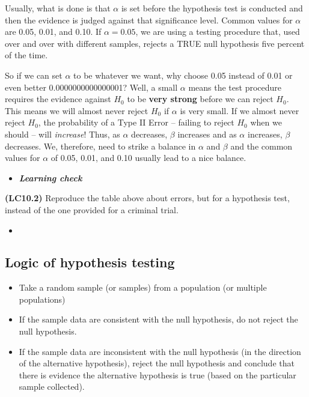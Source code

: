 \documentclass[12pt,]{krantz}
\providecommand{\tightlist}{%
  \setlength{\itemsep}{0pt}\setlength{\parskip}{0pt}}
\newenvironment{rmdblock}[1]
  {\begin{shaded*}
  \begin{itemize}
  \renewcommand{\labelitemi}{
    \raisebox{-.7\height}[0pt][0pt]{
    }
  }
  \item
  }
  {
  \end{itemize}
  \end{shaded*}
  }
\newenvironment{learncheck}
  {\begin{rmdblock}{warning}}
  {\end{rmdblock}}
\begin{document}
Usually, what is done is that \(\alpha\) is set before the hypothesis
test is conducted and then the evidence is judged against that
significance level. Common values for \(\alpha\) are 0.05, 0.01, and
0.10. If \(\alpha = 0.05\), we are using a testing procedure that, used
over and over with different samples, rejects a TRUE null hypothesis
five percent of the time.

So if we can set \(\alpha\) to be whatever we want, why choose 0.05
instead of 0.01 or even better 0.0000000000000001? Well, a small
\(\alpha\) means the test procedure requires the evidence against
\(H_0\) to be \textbf{very strong} before we can reject \(H_0\). This
means we will almost never reject \(H_0\) if \(\alpha\) is very small.
If we almost never reject \(H_0\), the probability of a Type II Error --
failing to reject \(H_0\) when we should -- will \emph{increase}! Thus,
as \(\alpha\) decreases, \(\beta\) increases and as \(\alpha\)
increases, \(\beta\) decreases. We, therefore, need to strike a balance
in \(\alpha\) and \(\beta\) and the common values for \(\alpha\) of
0.05, 0.01, and 0.10 usually lead to a nice balance.

\begin{learncheck}
\textbf{\emph{Learning check}}
\end{learncheck}

\textbf{(LC10.2)} Reproduce the table above about errors, but for a
hypothesis test, instead of the one provided for a criminal trial.

\begin{learncheck}

\end{learncheck}

\subsection{Logic of hypothesis
testing}\label{logic-of-hypothesis-testing}

\begin{itemize}
\tightlist
\item
  Take a random sample (or samples) from a population (or multiple
  populations)
\item
  If the sample data are consistent with the null hypothesis, do not
  reject the null hypothesis.
\item
  If the sample data are inconsistent with the null hypothesis (in the
  direction of the alternative hypothesis), reject the null hypothesis
  and conclude that there is evidence the alternative hypothesis is true
  (based on the particular sample collected).
\end{itemize}
\end{document}
